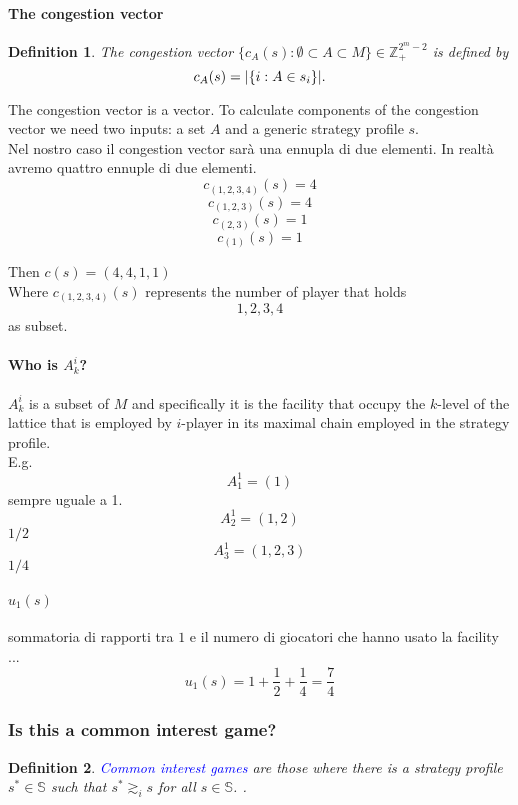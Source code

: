 \documentclass{article}
\newtheorem{defn}{Definition}
\begin{document}
\paragraph{The congestion vector}
\begin{defn}
	The congestion vector $\{c_A(s):\emptyset\subset A\subset M\}\in\mathbb Z_+^{2^m-2}$ is defined by $$c_A(s)=|\{i:A\in s_i\}|\text .$$
\end{defn}
The congestion vector is a vector. To calculate components of the congestion vector we need two inputs: a set $A$ and a generic strategy profile $s$. \\

Nel nostro caso il congestion vector sar\`a una ennupla di due elementi. In realt\`a avremo quattro ennuple di due elementi.
\[ c_{(1,2,3,4)} (s) = 4 \]
\[ c_{(1,2,3)}   (s) = 4 \]
\[ c_{(2,3)}     (s) = 1 \]
\[ c_{(1)}       (s) = 1 \]

Then $c(s) = (4,4,1,1)$ \\

Where $c_{(1,2,3,4)}(s)$ represents the number of player that holds $$ 1,2,3,4 $$ as subset.

\paragraph{Who is $A_k^i$?}
$A_k^i$ is a subset of $M$ and specifically it is the facility that occupy the $k$-level of the lattice that is employed by $i$-player in its maximal chain employed in the strategy profile. \\

E.g. 
\[ A_1^1 = (1) \] sempre uguale a 1.  
\[ A_2^1 = (1,2) \]  $1/2$
\[ A_3^1 = (1,2,3) \]  $1/4$


\paragraph{$u_1(s)$}
sommatoria di rapporti tra $1$ e il numero di giocatori che hanno usato la facility ...
\[
	u_1(s) = 1 + \frac{1}{2} + \frac{1}{4} = \frac{7}{4}
\]

 

\subsubsection{Is this a common interest game?}
\begin{defn}
	\textcolor{blue}{Common interest games} are those where there is a strategy profile $s^* \in \mathbb{S}$ such that $s^* \gtrsim_i s$ for all $s \in \mathbb{S}$. \cite{rossi01}.
\end{defn}
\end{document}
